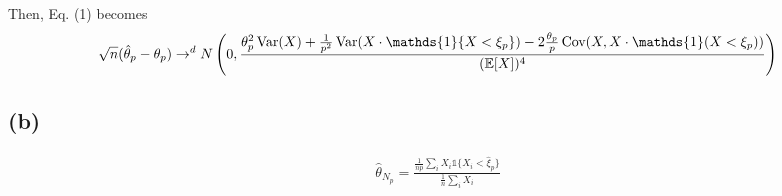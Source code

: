 \documentclass[../PSET1Tamer.tex]{subfiles}
\begin{document}
Then, Eq. (1) becomes
\begin{align*}
\sqrt{n}(\hat{\theta}_p - \theta_p) \to^d N\left(0, \frac{\theta_p^2\Var(X) + \frac{1}{p^2} \Var(X \cdot\mathds{1}\{X < \xi_p\}) - 2\frac{\theta_p}{p}\Cov(X, X\cdot\mathds{1}(X < \xi_p))}{(\E[X])^4}\right)
\end{align*}


\subsection*{(b)}
\begin{align*}
  \hat{\theta}_{N_p} = \frac{\frac{1}{np}\sum_{i} X_i \mathds{1}\{X_i<\hat{\xi}_p\}}{\frac{1}{n}\sum_{i}X_i}
\end{align*}
\end{document}
